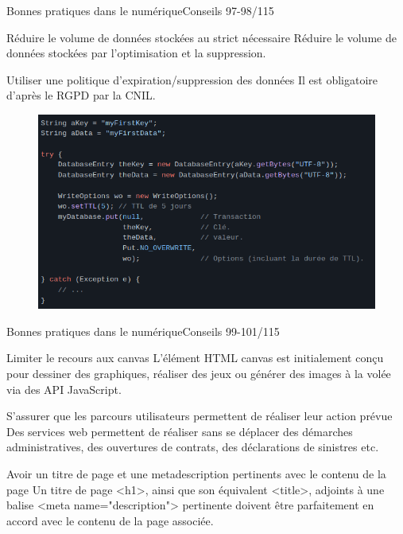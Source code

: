 \begin{frame}{Bonnes pratiques dans le numérique}{Conseils 97-98/115}
\begin{block}{Réduire le volume de données stockées au strict nécessaire}
Réduire le volume de données stockées par l'optimisation et la suppression.
\end{block}

\begin{block}{Utiliser une politique d'expiration/suppression des données}
 Il est obligatoire d'après le RGPD par la CNIL.
\begin{figure}
    \includegraphics[scale=0.35]{chapitre2/wdd8/fig/c4.png}
\end{figure}

\end{block}


\end{frame}


\begin{frame}{Bonnes pratiques dans le numérique}{Conseils 99-101/115}
\begin{block}{Limiter le recours aux canvas}
L'élément HTML canvas est initialement conçu pour dessiner des graphiques, réaliser des jeux ou générer des images à la volée via des API JavaScript.
\end{block}

\begin{block}{S'assurer que les parcours utilisateurs permettent de réaliser leur action prévue}
Des services web permettent de réaliser sans se déplacer des démarches administratives, des ouvertures de contrats, des déclarations de sinistres etc.
\end{block}

\begin{block}{Avoir un titre de page et une metadescription pertinents avec le contenu de la page}
Un titre de page <h1>, ainsi que son équivalent <title>, adjoints à une balise <meta name="description"> pertinente doivent être parfaitement en accord avec le contenu de la page associée. 
\end{block}

\end{frame}




